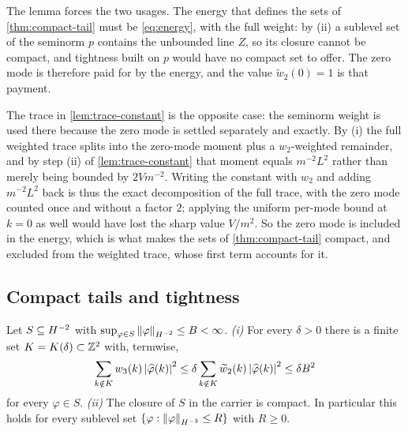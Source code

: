 The lemma forces the two usages. The energy that defines the sets of
\cref{thm:compact-tail} must be \eqref{eq:energy}, with the full weight: by
(ii) a sublevel set of the seminorm $p$ contains the unbounded line $Z$, so
its closure cannot be compact, and tightness built on $p$ would have no
compact set to offer. The zero mode is therefore paid for by the energy, and
the value $\widetilde w_2(0)=1$ is that payment.

The trace in \cref{lem:trace-constant} is the opposite case: the seminorm
weight is used there because the zero mode is settled separately and
exactly. By (i) the full weighted trace splits into the zero-mode moment
plus a $w_2$-weighted remainder, and by step (ii) of
\cref{lem:trace-constant} that moment equals $m^{-2}L^{2}$ rather than
merely being bounded by $2Vm^{-2}$. Writing the constant with $w_2$ and
adding $m^{-2}L^{2}$ back is thus the exact decomposition of the full trace,
with the zero mode counted once and without a factor $2$; applying the
uniform per-mode bound at $k=0$ as well would have lost the sharp value
$V/m^{2}$. So the zero mode is included in the energy, which is what makes
the sets of \cref{thm:compact-tail} compact, and excluded from the weighted
trace, whose first term accounts for it.

\subsection{Compact tails and tightness}

\begin{theorem}\label{thm:compact-tail}
Let $S\subseteq H^{-2}$ with $\sup_{\varphi\in S}\left\| \varphi \right\|_{H^{-2}}
\le B<\infty$. \emph{(i)} For every $\delta>0$ there is a finite set
$K=K(\delta)\subset\mathbb{Z}^2$ with, termwise,
\[
  \sum_{k\notin K}w_3(k)\left| \widehat\varphi(k) \right|^{2}
  \le\delta\sum_{k\notin K}\widetilde w_2(k)\left| \widehat\varphi(k) \right|^{2}
  \le\delta B^{2}
\]
for every $\varphi\in S$. \emph{(ii)} The closure of $S$ in the carrier is
compact. In particular this holds for every sublevel set
$\{\varphi:\left\| \varphi \right\|_{H^{-2}}\le R\}$ with $R\ge0$.
\end{theorem}

